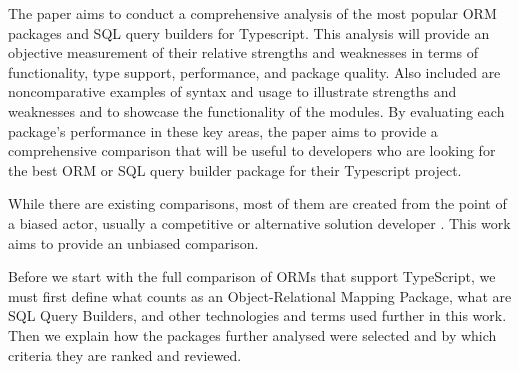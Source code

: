 The paper aims to conduct a comprehensive analysis of the most popular ORM
packages and SQL query builders for Typescript. This analysis will provide an
objective measurement of their relative strengths and weaknesses in terms of
functionality, type support, performance, and package quality. Also included are
noncomparative examples of syntax and usage to illustrate strengths and
weaknesses and to showcase the functionality of the modules. By evaluating each
package's performance in these key areas, the paper aims to provide a
comprehensive comparison that will be useful to developers who are looking for
the best ORM or SQL query builder package for their Typescript project.

While there are existing comparisons, most of them are created from the point of
a biased actor, usually a competitive or alternative solution developer
\cite{drizzleComparison} \cite{imdbBench}. This work aims to provide an unbiased
comparison.

Before we start with the full comparison of ORMs that support TypeScript, we
must first define what counts as an Object-Relational Mapping Package, what are
SQL Query Builders, and other technologies and terms used further in this work.
Then we explain how the packages further analysed were selected and by which
criteria they are ranked and reviewed.

